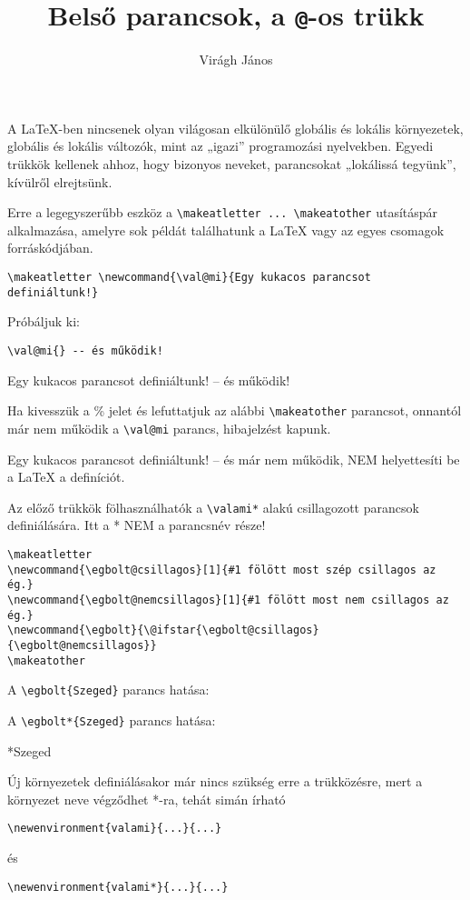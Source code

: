\documentclass{article}
\title{Belső parancsok, a \texttt{@}-os trükk}
\author{Virágh János}
\begin{document}
\maketitle
A \LaTeX-ben nincsenek olyan világosan elkülönülő globális és lokális környezetek, globális és lokális változók, mint az „igazi” programozási nyelvekben. Egyedi trükkök kellenek ahhoz,
hogy bizonyos neveket, parancsokat „lokálissá tegyünk”, kívülről elrejtsünk.

Erre a legegyszerűbb eszköz a \verb|\makeatletter ... \makeatother| utasításpár alkalmazása,
amelyre sok példát találhatunk a \LaTeX{} vagy az egyes csomagok forráskódjában. 

\verb|\makeatletter \newcommand{\val@mi}{Egy kukacos parancsot definiáltunk!}|

\makeatletter
\newcommand{\val@mi}{Egy kukacos parancsot definiáltunk!}
Próbáljuk ki:

\verb|\val@mi{} -- és működik!|

\val@mi{} -- és működik!

Ha kivesszük a \% jelet és lefuttatjuk az alábbi \verb|\makeatother| parancsot, onnantól már nem működik a \verb|\val@mi| parancs, hibajelzést kapunk.


\val@mi{} -- és már nem működik, NEM helyettesíti be a \LaTeX{} a definíciót.	

\pagebreak[4]Az előző trükkök fölhasználhatók a \verb|\valami*| alakú csillagozott parancsok definiálására. Itt a * NEM a parancsnév része!
\begin{verbatim}
\makeatletter
\newcommand{\egbolt@csillagos}[1]{#1 fölött most szép csillagos az ég.}
\newcommand{\egbolt@nemcsillagos}[1]{#1 fölött most nem csillagos az ég.}
\newcommand{\egbolt}{\@ifstar{\egbolt@csillagos}{\egbolt@nemcsillagos}}
\makeatother	
\end{verbatim}

\makeatletter
\newcommand{\egbolt@nemcsillagos}[1]{#1 fölött most nem csillagos az ég.}
\newcommand{\egbolt@csillagos}[1]{#1 fölött most szép csillagos az ég.}
\newcommand{\egbolt}{\@ifstar{\egbolt@csillagos}{\egbolt@nemcsillagos}}
\makeatother

A \verb|\egbolt{Szeged}| parancs hatása:

\egbolt{Szeged}

A \verb|\egbolt*{Szeged}| parancs hatása:

\egbolt*{Szeged}

Új környezetek definiálásakor már nincs szükség erre a trükközésre, mert a környezet neve végződhet *-ra, tehát simán írható

\verb|\newenvironment{valami}{...}{...}|

és

\verb|\newenvironment{valami*}{...}{...}|
\end{document}

